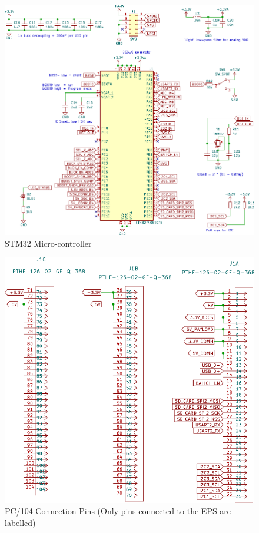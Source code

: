  
   \begin{figure}[H]
 	\centering
 	\includegraphics[width=\columnwidth]{FrontMatter/pcb-STM32F405board.pdf}
 	\caption{\centering STM32 Micro-controller}
 	\label{fig:uC 4lr}
 \end{figure}


   \begin{figure}[H]
 	\centering
 	\includegraphics[width=0.99\columnwidth]{FrontMatter/pcb.pdf}
 	\caption{\centering PC/104 Connection Pins (Only pins connected to the EPS are labelled)}
 	\label{fig:pc104 4lr}
 \end{figure}
 \pagebreak
